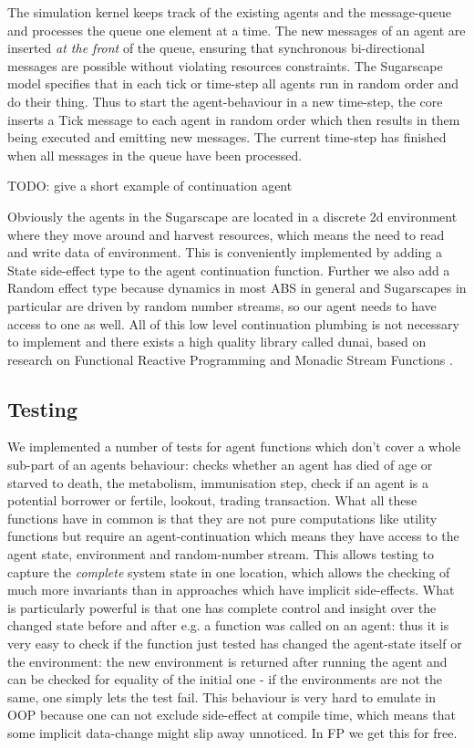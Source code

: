 The simulation kernel keeps track of the existing agents and the message-queue and processes the queue one element at a time. The new messages of an agent are inserted \textit{at the front} of the queue, ensuring that synchronous bi-directional messages are possible without violating resources constraints. The Sugarscape model specifies that in each tick or time-step all agents run in random order and do their thing. Thus to start the agent-behaviour in a new time-step, the core inserts a Tick message to each agent in random order which then results in them being executed and emitting new messages. The current time-step has finished when all messages in the queue have been processed.

\begin{HaskellCode}
TODO: give a short example of continuation agent
\end{HaskellCode}

Obviously the agents in the Sugarscape are located in a discrete 2d environment where they move around and harvest resources, which means the need to read and write data of environment. This is conveniently implemented by adding a State side-effect type to the agent continuation function. Further we also add a Random effect type because dynamics in most ABS in general and Sugarscapes in particular are driven by random number streams, so our agent needs to have access to one as well. All of this low level continuation plumbing is not necessary to implement and there exists a high quality library called dunai, based on research on Functional Reactive Programming  \cite{hudak_arrows_2003} and Monadic Stream Functions \cite{perez_functional_2016,perez_extensible_2017}.

\subsection{Testing}
We implemented a number of tests for agent functions which don't cover a whole sub-part of an agents behaviour: checks whether an agent has died of age or starved to death, the metabolism, immunisation step, check if an agent is a potential borrower or fertile, lookout, trading transaction. What all these functions have in common is that they are not pure computations like utility functions but require an agent-continuation which means they have access to the agent state, environment and random-number stream. This allows testing to capture the \textit{complete} system state in one location, which allows the checking of much more invariants than in approaches which have implicit side-effects.
What is particularly powerful is that one has complete control and insight over the changed state before and after e.g. a function was called on an agent: thus it is very easy to check if the function just tested has changed the agent-state itself or the environment: the new environment is returned after running the agent and can be checked for equality of the initial one - if the environments are not the same, one simply lets the test fail. This behaviour is very hard to emulate in OOP because one can not exclude side-effect at compile time, which means that some implicit data-change might slip away unnoticed. In FP we get this for free.

